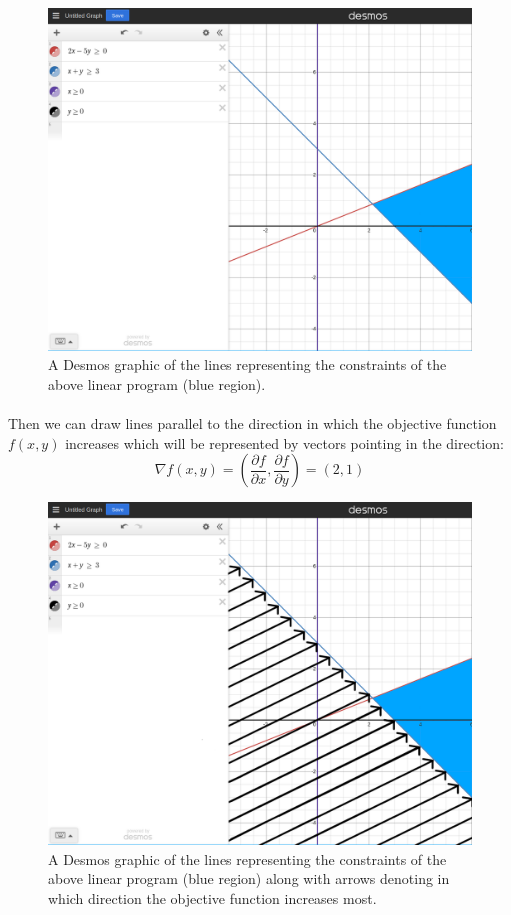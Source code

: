 \documentclass{article}
\begin{document}
\begin{figure}
    \centering
    \includegraphics[scale=0.35]{desmos_lp_edited.png}
    \caption{A Desmos graphic of the lines representing the constraints of the above linear program (blue region).}
    \label{fig:desmos-lp}
\end{figure}
\paragraph{}Then we can draw lines parallel to the direction in which the objective function $f(x, y)$ increases which will be represented by vectors pointing in the direction: $$\nabla f(x,y) = (\frac{\partial f}{\partial x}, \frac{\partial f}{\partial y}) = (2,1)$$

\pagebreak

\begin{figure}
    \centering
    \includegraphics[scale=0.35]{desmos_lp_edited_2.png}
    \caption{A Desmos graphic of the lines representing the constraints of the above linear program (blue region) along with arrows denoting in which direction the objective function increases most.}
    \label{fig:enter-label}
\end{figure}
\end{document}
